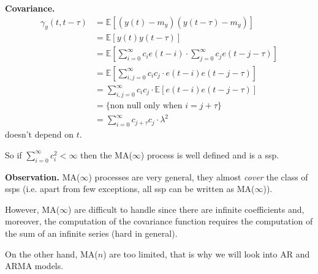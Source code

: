 \textbf{Covariance.}
\begin{align*}
	\gamma_{y}(t, t-\tau) &=\mathbb{E}[(y(t)-m_{y}) (y(t-\tau)-m_{y})]\\
	&=\mathbb{E}[y(t) y(t-\tau)]\\
	&=\mathbb{E}\left[\sum_{i=0}^{\infty} c_{i} e(t-i) \cdot \sum_{j=0}^{\infty} c_{j} e(t-j-\tau)\right]\\
	&=\mathbb{E}\left[\sum_{i, j=0}^{\infty} c_{i} c_{j} \cdot e(t-i) e(t-j-\tau)\right]\\
	&=\sum_{i, j=0}^{\infty} c_{i} c_{j} \cdot \mathbb{E}[e(t-i) e(t-j-\tau)]\\
	&=\{\text{non null only when }i=j+\tau\}\\
	&=\sum_{i=0}^{\infty} c_{j+\tau}c_{j}\cdot\lambda^2 
\end{align*}
doesn't depend on $t$.

So if $\sum_{i=0}^{\infty} c_{i}^{2}<\infty$ then the MA($\infty $) process is well defined and is a \gls{ssp}.

\textbf{Observation.} MA($\infty$) processes are very general, they almost \emph{cover} the class of \glspl{ssp} (i.e. apart from few exceptions, all \gls{ssp} can be written as MA($\infty$)).

However, MA($\infty$) are difficult to handle since there are infinite coefficients and, moreover, the computation of the covariance function requires the computation of the sum of an infinite series (hard in general).

On the other hand, MA($n$) are too limited, that is why we will look into AR and ARMA models.